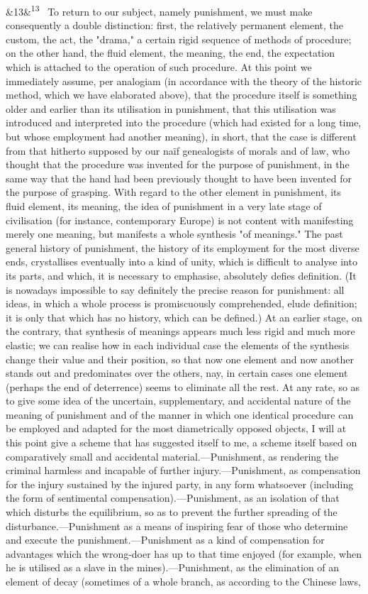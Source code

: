 \documentclass[12pt]{article}
\newcommand{\para}[1][]{\par\noindent\ifx&#1&\else\textsuperscript{\footnotesize #1}~\fi}
\begin{document}
\para[13] To return to our subject, namely punishment, we must make consequently a double distinction: first, the relatively permanent element, the custom, the act, the "drama," a certain rigid sequence of methods of procedure; on the other hand, the fluid element, the meaning, the end, the expectation which is attached to the operation of such procedure. At this point we immediately assume, per analogiam (in accordance with the theory of the historic method, which we have elaborated above), that the procedure itself is something older and earlier than its utilisation in punishment, that this utilisation was introduced and interpreted into the procedure (which had existed for a long time, but whose employment had another meaning), in short, that the case is different from that hitherto supposed by our naïf genealogists of morals and of law, who thought that the procedure was invented for the purpose of punishment, in the same way that the hand had been previously thought to have been invented for the purpose of grasping. With regard to the other element in punishment, its fluid element, its meaning, the idea of punishment in a very late stage of civilisation (for instance, contemporary Europe) is not content with manifesting merely one meaning, but manifests a whole synthesis "of meanings." The past general history of punishment, the history of its employment for the most diverse ends, crystallises eventually into a kind of unity, which is difficult to analyse into its parts, and which, it is necessary to emphasise, absolutely defies definition. (It is nowadays impossible to say definitely the precise reason for punishment: all ideas, in which a whole process is promiscuously comprehended, elude definition; it is only that which has no history, which can be defined.) At an earlier stage, on the contrary, that synthesis of meanings appears much less rigid and much more elastic; we can realise how in each individual case the elements of the synthesis change their value and their position, so that now one element and now another stands out and predominates over the others, nay, in certain cases one element (perhaps the end of deterrence) seems to eliminate all the rest. At any rate, so as to give some idea of the uncertain, supplementary, and accidental nature of the meaning of punishment and of the manner in which one identical procedure can be employed and adapted for the most diametrically opposed objects, I will at this point give a scheme that has suggested itself to me, a scheme itself based on comparatively small and accidental material.---Punishment, as rendering the criminal harmless and incapable of further injury.---Punishment, as compensation for the injury sustained by the injured party, in any form whatsoever (including the form of sentimental compensation).---Punishment, as an isolation of that which disturbs the equilibrium, so as to prevent the further spreading of the disturbance.---Punishment as a means of inspiring fear of those who determine and execute the punishment.---Punishment as a kind of compensation for advantages which the wrong-doer has up to that time enjoyed (for example, when he is utilised as a slave in the mines).---Punishment, as the elimination of an element of decay (sometimes of a whole branch, as according to the Chinese laws, 
\end{document}
